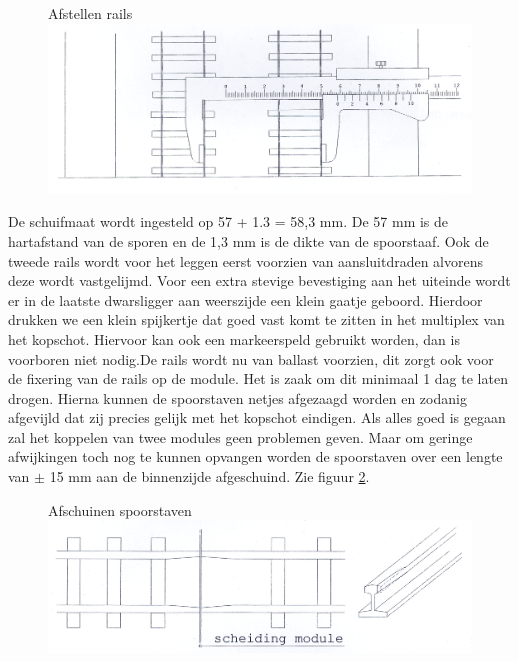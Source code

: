 \documentclass[12pt,a4paper]{report}
\begin{document}
\begin{figure}[ht]
  \captionbox
  {Afstellen rails\label{figuur5}}
  {\includegraphics[scale=1.0]{images/rcu_figuur5}}
\end{figure}

De schuifmaat wordt ingesteld op 57 + 1.3 = 58,3 mm. De 57 mm is de hartafstand van de sporen en de 1,3 mm is de dikte van de spoorstaaf.
Ook de tweede rails wordt voor het leggen eerst voorzien van aansluitdraden alvorens deze wordt vastgelijmd.
Voor een extra stevige bevestiging aan het uiteinde wordt er in de laatste dwarsligger aan weerszijde een klein gaatje geboord. Hierdoor drukken we een klein spijkertje dat goed vast komt te zitten in het multiplex van het kopschot. Hiervoor kan ook een markeerspeld gebruikt worden, dan is voorboren niet nodig.De rails wordt nu van ballast voorzien, dit zorgt ook voor de fixering van de rails op de module. Het is zaak om dit minimaal 1 dag te laten drogen.
Hierna kunnen de spoorstaven netjes afgezaagd worden en zodanig afgevijld dat zij precies gelijk met het kopschot eindigen. Als alles goed is gegaan zal het koppelen van twee modules geen problemen geven. Maar om geringe afwijkingen toch nog te kunnen opvangen worden de spoorstaven over een lengte van $\pm$ 15 mm aan de binnenzijde afgeschuind. Zie figuur \ref{figuur6}.

\begin{figure}[!ht]
  \captionbox
  {Afschuinen spoorstaven\label{figuur6}}
  {\includegraphics[scale=1.0]{images/rcu_figuur6}}
\end{figure}
\end{document}
